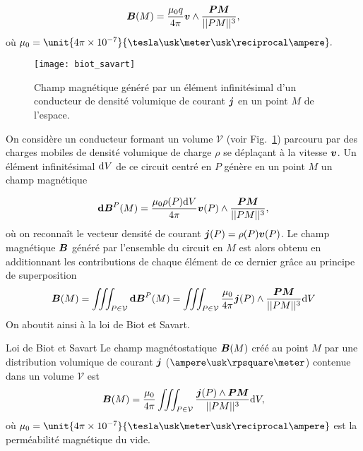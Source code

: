 \begin{equation*}
	\vecb(M) = \dfrac{\mu_0 q}{4 \pi} \vecv \wedge \dfrac{\mitbf{PM}}{||PM||^3},
\end{equation*}
où $\mu_0 = \unit{4 \pi \times 10^{-7}}{\tesla \usk \meter \usk \reciprocal 
\ampere}.$

\begin{figure}[h!]
	\centering
	\texttt{[image: biot\_savart]}
	\caption{Champ magnétique généré par un élément infinitésimal d'un conducteur
	de densité volumique de courant $\vecj$ en un point $M$ de l'espace.}%
	\label{fig:magneto_biot_savart}
\end{figure}

On considère un conducteur formant un volume $\mathcal{V}$ 
(voir Fig.~\ref{fig:magneto_biot_savart}) parcouru par des charges mobiles 
de densité volumique de charge $\rho$ se déplaçant à la vitesse $\vecv$. Un élément 
infinitésimal $\mathrm{d}V$ de ce circuit centré en $P$ génère en un point $M$ un champ magnétique

\begin{equation*}
	\mathrm{\textbf{d}}\mitbf{B}^P(M) = \dfrac{\mu_0 \rho(P) \dV}
	{4 \pi} \vecv(P) \wedge 
	          \dfrac{\mitbf{PM}}{||PM||^3},
\end{equation*}
où on reconnaît le vecteur densité de courant $\vecj(P) = \rho(P) \vecv(P)$. 
Le champ magnétique
$\vecb$ généré par l'ensemble du circuit en $M$ est alors obtenu en additionnant les 
contributions de chaque élément de ce dernier grâce au principe de superposition
\begin{equation*}
	\vecb(M) = \iiint_{P \in \mathcal{V}} \mathbf{d}\vec{B}^P(M)
		 = \iiint_{P \in \mathcal{V}} \dfrac{\mu_0}
		 {4 \pi} \vecj(P) \wedge 
          \dfrac{\mitbf{PM}}{||PM||^3} \dV
\end{equation*}
On aboutit ainsi à la loi de Biot et Savart.

\begin{defn}{Loi de Biot et Savart}
	Le champ magnétostatique $\vecb(M)$ créé au point $M$ par une distribution
	volumique de courant $\vecj$ ($\ampere \usk \rpsquare \meter$) contenue
	dans un volume $\mathcal{V}$ est
	\begin{equation}
		\vecb(M) = \dfrac{\mu_0}{4 \pi} \iiint_{P \in \mathcal{V}} 
		\dfrac{\vecj(P) \wedge \mitbf{PM}}{||PM||^3} \dV,
	\end{equation}
	où $\mu_0 = \unit{4 \pi \times 10^{-7}}{\tesla \usk \meter \usk \reciprocal
	\ampere}$ est la perméabilité magnétique du vide.

\end{defn}

